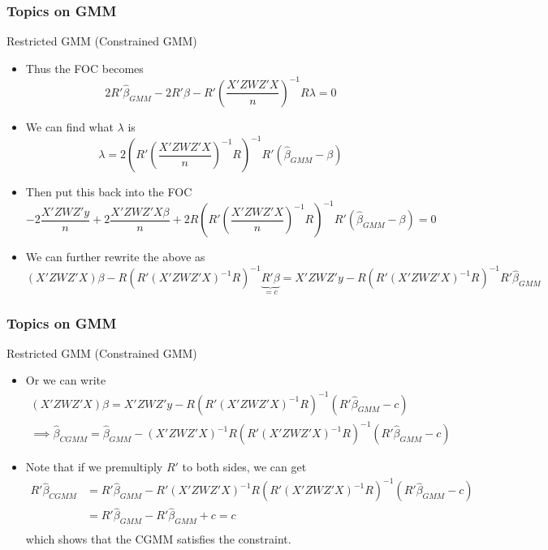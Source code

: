 \documentclass{beamer}
\begin{document}
\begin{frame}
\frametitle{Topics on GMM}
Restricted GMM (Constrained GMM)
\begin{itemize}
\item Thus the FOC becomes
\[
2R'\hat{\beta}_{GMM}-2R'\beta-R'\left(\frac{X'ZWZ'X}{n}\right)^{-1}R\lambda =0
\]
\item We can find what $\lambda$ is
\[
\lambda = 2\left(R'\left(\frac{X'ZWZ'X}{n}\right)^{-1}R\right)^{-1}R'(\hat{\beta}_{GMM}-\beta)
\]
\item Then put this back into the FOC 
\footnotesize{\[
-2\frac{X'ZWZ'y}{n}+2\frac{X'ZWZ'X\beta}{n}+2R\left(R'\left(\frac{X'ZWZ'X}{n}\right)^{-1}R\right)^{-1}R'(\hat{\beta}_{GMM}-\beta)=0
\]}\normalsize
\item We can further rewrite the above as
\footnotesize{\[
(X'ZWZ'X)\beta-R(R'(X'ZWZ'X)^{-1}R)^{-1}\underbrace{R'\beta}_{=c}=X'ZWZ'y-R(R'(X'ZWZ'X)^{-1}R)^{-1}R'\hat{\beta}_{GMM}
\]}\normalsize
\end{itemize}
\end{frame}

\begin{frame}
\frametitle{Topics on GMM}
Restricted GMM (Constrained GMM)
\begin{itemize}
\item Or we can write
 \footnotesize{\begin{gather*}
(X'ZWZ'X)\beta=X'ZWZ'y-R(R'(X'ZWZ'X)^{-1}R)^{-1}(R'\hat{\beta}_{GMM}-c)\\
\implies\hat{\beta}_{CGMM}=\hat{\beta}_{GMM}-(X'ZWZ'X)^{-1}R(R'(X'ZWZ'X)^{-1}R)^{-1}(R'\hat{\beta}_{GMM}-c)
\end{gather*}}\normalsize
\par 
\item Note that if we premultiply $R'$ to both sides, we can get
\footnotesize{\[
\begin{aligned}
R'\hat{\beta}_{CGMM}&=R'\hat{\beta}_{GMM}-R'(X'ZWZ'X)^{-1}R(R'(X'ZWZ'X)^{-1}R)^{-1}(R'\hat{\beta}_{GMM}-c)\\
&=R'\hat{\beta}_{GMM}-R'\hat{\beta}_{GMM}+c=c\\
\end{aligned}
\]}\normalsize
which shows that the CGMM satisfies the constraint.
\end{itemize}
\end{frame}
\end{document}

